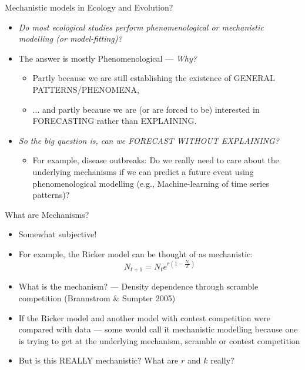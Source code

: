 \documentclass[xcolor=x11names,compress]{beamer}
\renewcommand{\(}{\begin{columns}}
\renewcommand{\)}{\end{columns}}
\newcommand{\<}[1]{\begin{column}{#1}}
\renewcommand{\>}{\end{column}}
\begin{document}
\begin{frame}{Mechanistic models in Ecology and Evolution?}

\begin{itemize}[<+->] \itemsep12pt
	\item \it Do most ecological studies perform phenomenological or mechanistic modelling (or model-fitting)?
	
	\item The answer is mostly Phenomenological \pause --- {\it Why?} \pause
	\begin{itemize}
		\item Partly because we are still establishing the existence of GENERAL PATTERNS/PHENOMENA,
		\item  ... and partly because we are (or are forced to be) interested in FORECASTING rather than EXPLAINING. 
 
	\end{itemize}	  
	
	\item {\it So the big question is, can we FORECAST WITHOUT EXPLAINING?}
	
	\begin{itemize}
		\item For example, disease outbreaks: Do we really need to care about the underlying mechanisms if we can predict a future event using phenomenological modelling (e.g., Machine-learning of time series patterns)?
		
	\end{itemize}

\end{itemize}

\end{frame}

\begin{frame}{What are Mechanisms?}

   \begin{itemize}[<+->] \itemsep10pt
			\item Somewhat subjective! 
			\item For example, the Ricker model can be thought of as 
			mechanistic:
			$$ 
				N_{t+1} = N_t e^{r\left(1-\frac{N_t}{k}\right)} 
			$$ 
				
			\item What is the mechanism? \pause --- Density dependence through scramble competition (Brannstrom \& Sumpter 2005)

			\item If the Ricker model and another model with contest 
			competition were compared with data --- some would call it mechanistic  modelling because one is trying to get at the underlying mechanism, scramble or contest competition
			
			\item But is this REALLY mechanistic? What are $r$ and $k$ really?
   \end{itemize}

\end{frame}
\end{document}
